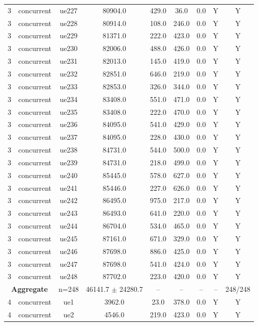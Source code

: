 \begin{table}[ht]
\begin{tabular}{|c|c|c|c|c|c|c|c|c|}
3 & concurrent & ue227 & 80904.0 & 429.0 & 36.0 & 0.0 & Y & Y \\
3 & concurrent & ue228 & 80914.0 & 108.0 & 246.0 & 0.0 & Y & Y \\
3 & concurrent & ue229 & 81371.0 & 222.0 & 423.0 & 0.0 & Y & Y \\
3 & concurrent & ue230 & 82006.0 & 488.0 & 426.0 & 0.0 & Y & Y \\
3 & concurrent & ue231 & 82013.0 & 145.0 & 419.0 & 0.0 & Y & Y \\
3 & concurrent & ue232 & 82851.0 & 646.0 & 219.0 & 0.0 & Y & Y \\
3 & concurrent & ue233 & 82853.0 & 326.0 & 344.0 & 0.0 & Y & Y \\
3 & concurrent & ue234 & 83408.0 & 551.0 & 471.0 & 0.0 & Y & Y \\
3 & concurrent & ue235 & 83408.0 & 222.0 & 470.0 & 0.0 & Y & Y \\
3 & concurrent & ue236 & 84095.0 & 541.0 & 429.0 & 0.0 & Y & Y \\
3 & concurrent & ue237 & 84095.0 & 228.0 & 430.0 & 0.0 & Y & Y \\
3 & concurrent & ue238 & 84731.0 & 544.0 & 500.0 & 0.0 & Y & Y \\
3 & concurrent & ue239 & 84731.0 & 218.0 & 499.0 & 0.0 & Y & Y \\
3 & concurrent & ue240 & 85445.0 & 578.0 & 627.0 & 0.0 & Y & Y \\
3 & concurrent & ue241 & 85446.0 & 227.0 & 626.0 & 0.0 & Y & Y \\
3 & concurrent & ue242 & 86495.0 & 975.0 & 217.0 & 0.0 & Y & Y \\
3 & concurrent & ue243 & 86493.0 & 641.0 & 220.0 & 0.0 & Y & Y \\
3 & concurrent & ue244 & 86704.0 & 534.0 & 465.0 & 0.0 & Y & Y \\
3 & concurrent & ue245 & 87161.0 & 671.0 & 329.0 & 0.0 & Y & Y \\
3 & concurrent & ue246 & 87698.0 & 886.0 & 425.0 & 0.0 & Y & Y \\
3 & concurrent & ue247 & 87698.0 & 541.0 & 424.0 & 0.0 & Y & Y \\
3 & concurrent & ue248 & 87702.0 & 223.0 & 420.0 & 0.0 & Y & Y \\
\multicolumn{2}{|c|}{\textbf{Aggregate}} & n=248 & 46141.7 $\pm$ 24280.7 & -- & -- & -- & -- & 248/248 \\
\hline
4 & concurrent & ue1 & 3962.0 & 23.0 & 378.0 & 0.0 & Y & Y \\
4 & concurrent & ue2 & 4546.0 & 219.0 & 423.0 & 0.0 & Y & Y \\

\end{tabular}
\end{table}
